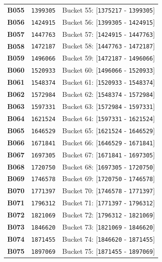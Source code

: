 \documentclass[11pt,a4paper]{article}
\begin{document}
{{\begin{xltabular}{\textwidth}{l | C | C}
\textbf{B055} & \texttt{1399305} & Bucket 55: [\texttt{1375217} - \texttt{1399305}] \\
\textbf{B056} & \texttt{1424915} & Bucket 56: [\texttt{1399305} - \texttt{1424915}] \\
\textbf{B057} & \texttt{1447763} & Bucket 57: [\texttt{1424915} - \texttt{1447763}] \\
\textbf{B058} & \texttt{1472187} & Bucket 58: [\texttt{1447763} - \texttt{1472187}] \\
\textbf{B059} & \texttt{1496066} & Bucket 59: [\texttt{1472187} - \texttt{1496066}] \\
\textbf{B060} & \texttt{1520933} & Bucket 60: [\texttt{1496066} - \texttt{1520933}] \\
\textbf{B061} & \texttt{1548374} & Bucket 61: [\texttt{1520933} - \texttt{1548374}] \\
\textbf{B062} & \texttt{1572984} & Bucket 62: [\texttt{1548374} - \texttt{1572984}] \\
\textbf{B063} & \texttt{1597331} & Bucket 63: [\texttt{1572984} - \texttt{1597331}] \\
\textbf{B064} & \texttt{1621524} & Bucket 64: [\texttt{1597331} - \texttt{1621524}] \\
\textbf{B065} & \texttt{1646529} & Bucket 65: [\texttt{1621524} - \texttt{1646529}] \\
\textbf{B066} & \texttt{1671841} & Bucket 66: [\texttt{1646529} - \texttt{1671841}] \\
\textbf{B067} & \texttt{1697305} & Bucket 67: [\texttt{1671841} - \texttt{1697305}] \\
\textbf{B068} & \texttt{1720750} & Bucket 68: [\texttt{1697305} - \texttt{1720750}] \\
\textbf{B069} & \texttt{1746578} & Bucket 69: [\texttt{1720750} - \texttt{1746578}] \\
\textbf{B070} & \texttt{1771397} & Bucket 70: [\texttt{1746578} - \texttt{1771397}] \\
\textbf{B071} & \texttt{1796312} & Bucket 71: [\texttt{1771397} - \texttt{1796312}] \\
\textbf{B072} & \texttt{1821069} & Bucket 72: [\texttt{1796312} - \texttt{1821069}] \\
\textbf{B073} & \texttt{1846620} & Bucket 73: [\texttt{1821069} - \texttt{1846620}] \\
\textbf{B074} & \texttt{1871455} & Bucket 74: [\texttt{1846620} - \texttt{1871455}] \\
\textbf{B075} & \texttt{1897069} & Bucket 75: [\texttt{1871455} - \texttt{1897069}] \\

\end{xltabular}}}
\end{document}
